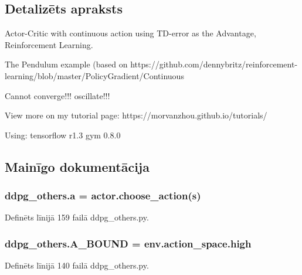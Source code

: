 \subsection{Detalizēts apraksts}
\begin{DoxyVerb}Actor-Critic with continuous action using TD-error as the Advantage, Reinforcement Learning.

The Pendulum example (based on https://github.com/dennybritz/reinforcement-learning/blob/master/PolicyGradient/Continuous%

Cannot converge!!! oscillate!!!

View more on my tutorial page: https://morvanzhou.github.io/tutorials/

Using:
tensorflow r1.3
gym 0.8.0
\end{DoxyVerb}
 

\subsection{Mainīgo dokumentācija}
\subsubsection[{\texorpdfstring{a}{a}}]{\setlength{\rightskip}{0pt plus 5cm}ddpg\+\_\+others.\+a = actor.\+choose\+\_\+action({\bf s})}\hypertarget{namespaceddpg__others_a5074dd5702ee1c582994c8544c0ac4f1}{}\label{namespaceddpg__others_a5074dd5702ee1c582994c8544c0ac4f1}


Definēts līnijā 159 failā ddpg\+\_\+others.\+py.

\subsubsection[{\texorpdfstring{A\+\_\+\+B\+O\+U\+ND}{A_BOUND}}]{\setlength{\rightskip}{0pt plus 5cm}ddpg\+\_\+others.\+A\+\_\+\+B\+O\+U\+ND = env.\+action\+\_\+space.\+high}\hypertarget{namespaceddpg__others_a7e1c48752aba637fb6cea31fa0eaa826}{}\label{namespaceddpg__others_a7e1c48752aba637fb6cea31fa0eaa826}


Definēts līnijā 140 failā ddpg\+\_\+others.\+py.

